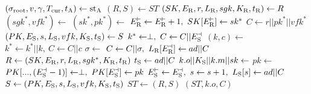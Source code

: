 \algrenewcommand\textproc{}
\algrenewcommand{}

\begin{minipage}{1\linewidth}
  {\fontsize{8}{10}\selectfont%
    \begin{multicols}{2}
  \begin{algorithmic}[1]
    \State $(\sigma_\text{root},v,\gamma,T_\text{cur},t_\text{A}) \gets \text{st}_\text{A}$
    \State $(R,S) \gets ST$
    \State $(SK,E_\text{R},r,L_\text{R},sgk,K_\text{R},t_\text{R}) \gets R$
    \State $(sgk^*,vfk^*) \gets$ 
    \State $(sk^*,pk^*) \gets$ 
    \State $E_\t{R}^\vdash \gets E_\t{R}^\vdash+1, \ SK[E_\t{R}^\vdash] \gets sk^*$
    \State $C \gets r || pk^* || vfk^*$
    \State $(PK,E_\text{S},s,L_\text{S},vfk,K_\text{S},t_\text{S}) \gets S$
    \State $k^* \gets \perp, \ C \gets C || E_\text{S}^\dashv$
    \State $(k,c) \gets$ 
    \State $k^* \gets k^* || k, \ C \gets C || c$ 
    \EndFor
    \State $\sigma \gets$ 
    \State $C \gets C || \sigma, \ L_\t{R}[E_\t{R}^\dashv] \gets ad||C$
    \State $R \gets (SK,E_\text{R},r,L_\text{R},sgk^*,K_\text{R},t_\text{R})$
    \State $t_\text{S} \gets ad||C$
    \State $k.o || K_\text{S} || k.m || sk \gets$ 
    \State $pk \gets$ 
    \State $PK[...,(E_\t{S}^\dashv -1)] \gets \perp, \ PK[E_\t{S}^\dashv] \gets pk$
    \State $E_\text{S}^\vdash \gets E_\text{S}^\dashv, \ s \gets s+1, \ L_\text{S}[s] \gets ad||C$
    \State $S \gets (PK,E_\text{S},s,L_\text{S},vfk,K_\text{S},t_\text{S})$
    \State $ST \gets (R,S)$
    \State \Return $(ST,k.o,C)$
    \EndProcedure
  \end{algorithmic}
\end{multicols}
  }
\end{minipage}
